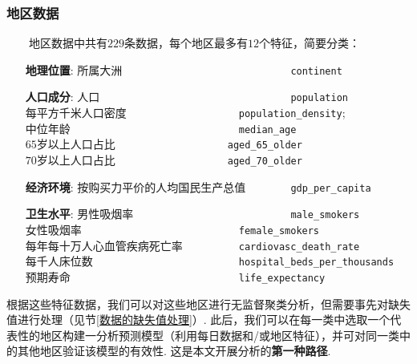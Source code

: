 \documentclass[a4paper, titlepage]{article}
\begin{document}
        \subsubsection*{地区数据}
        　　地区数据中共有$229$条数据，每个地区最多有$12$个特征，简要分类：
        \vspace{5pt}
        \begin{adjustwidth}{1cm}{0cm}
        {\kaishu
        \begin{itemize}[itemsep=-1pt]
            \item [\textbf{地理位置}:]
                所属大洲　　　　　　　　　　　　　　　\texttt{continent}
            \item [\textbf{人口成分}:]
                人口　　　　　　　　　　　　　　　　　\texttt{population}\\ 
                每平方千米人口密度　　　　　　　　　　\texttt{population\_density}; \\
                中位年龄　　　　　　　　　　　　　　　\texttt{median\_age}\\
                $65$岁以上人口占比　　　　　　　　　　\hspace{1.1em}\texttt{aged\_65\_older}\\
                $70$岁以上人口占比　　　　　　　　　　\hspace{1.1em}\texttt{aged\_70\_older}
            \item [\textbf{经济环境}:]
                按购买力平价的人均国民生产总值　　　　\texttt{gdp\_per\_capita}
            \item [\textbf{卫生水平}:]
                男性吸烟率　　　　　　　　　　　　　　\texttt{male\_smokers}\\ 
                女性吸烟率　　　　　　　　　　　　　　\texttt{female\_smokers}\\ 
                每年每十万人心血管疾病死亡率　　　　　\texttt{cardiovasc\_death\_rate}\\ 
                每千人床位数　　　　　　　　　　　　　\texttt{hospital\_beds\_per\_thousands}\\ 
                预期寿命　　　　　　　　　　　　　　　\texttt{life\_expectancy}
        \end{itemize}
        }
        \end{adjustwidth}
        \vspace{5pt}
        根据这些特征数据，我们可以对这些地区进行无监督聚类分析，但需要事先对缺失值进行处理（见节\ref{数据的缺失值处理}）. 此后，我们可以在每一类中选取一个代表性的地区构建一分析预测模型（利用每日数据和/或地区特征），并可对同一类中的其他地区验证该模型的有效性. 这是本文开展分析的\textbf{第一种路径}.
        
\end{document}
